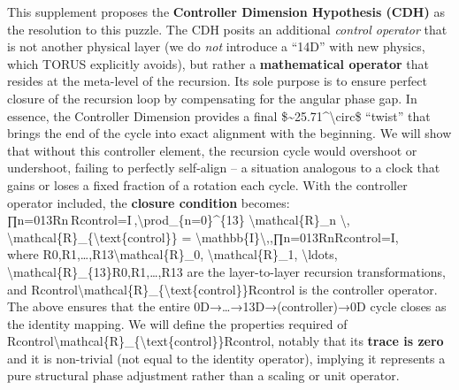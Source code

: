 \documentclass[]{article}
\begin{document}
This supplement proposes the \textbf{Controller Dimension Hypothesis
(CDH)} as the resolution to this puzzle. The CDH posits an additional
\emph{control operator} that is not another physical layer (we do
\emph{not} introduce a ``14D'' with new physics, which TORUS explicitly
avoids​), but rather a \textbf{mathematical operator} that resides at
the meta-level of the recursion. Its sole purpose is to ensure perfect
closure of the recursion loop by compensating for the angular phase gap.
In essence, the Controller Dimension provides a final
\$\textasciitilde{}25.71\^{}\textbackslash{}circ\$ ``twist'' that brings
the end of the cycle into exact alignment with the beginning. We will
show that without this controller element, the recursion cycle would
overshoot or undershoot, failing to perfectly self-align -- a situation
analogous to a clock that gains or loses a fixed fraction of a rotation
each cycle. With the controller operator included, the \textbf{closure
condition} becomes:\\
∏n=013Rn Rcontrol=I ,\textbackslash{}prod\_\{n=0\}\^{}\{13\}
\textbackslash{}mathcal\{R\}\_n \textbackslash{},
\textbackslash{}mathcal\{R\}\_\{\textbackslash{}text\{control\}\} =
\textbackslash{}mathbb\{I\}\textbackslash{},,∏n=013​Rn​Rcontrol​=I,\\
where R0,R1,\ldots{},R13\textbackslash{}mathcal\{R\}\_0,
\textbackslash{}mathcal\{R\}\_1, \textbackslash{}ldots,
\textbackslash{}mathcal\{R\}\_\{13\}R0​,R1​,\ldots{},R13​ are the
layer-to-layer recursion transformations, and
Rcontrol\textbackslash{}mathcal\{R\}\_\{\textbackslash{}text\{control\}\}Rcontrol​
is the controller operator. The above ensures that the entire
0D→\ldots{}→13D→(controller)→0D cycle closes as the identity mapping. We
will define the properties required of
Rcontrol\textbackslash{}mathcal\{R\}\_\{\textbackslash{}text\{control\}\}Rcontrol​,
notably that its \textbf{trace is zero} and it is non-trivial (not equal
to the identity operator), implying it represents a pure structural
phase adjustment rather than a scaling or unit operator.
\end{document}

